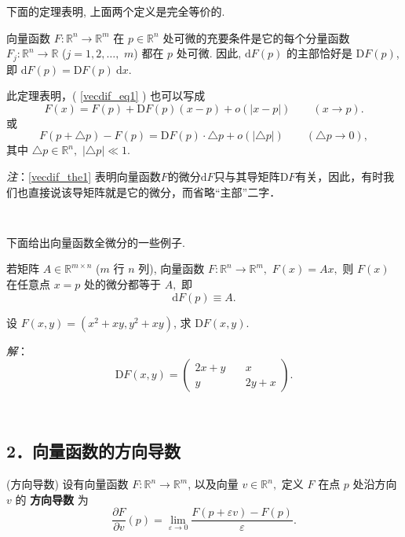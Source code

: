 下面的定理表明, 上面两个定义是完全等价的. 

\begin{theorem}{}\label{vecdif_the1}
向量函数 $F:\mathbb{R}^{n}\rightarrow\mathbb{R}^{m}$ 在 $p\in\mathbb{R}^{n}$
处可微的充要条件是它的每个分量函数 $F_{j}:\mathbb{R}^{n}\rightarrow\mathbb{R}$ ($j=1,2,\ldots,$ $m$)
都在 $p$ 处可微. 因此, $\mathrm{d}F(p)$ 的主部恰好是 $\mathrm{D}F(p)$, 即 $\mathrm{d}F(p)=\mathrm{D}F(p)~\mathrm{d}x$.

此定理表明，( \autoref{vecdif_eq1} ) 也可以写成
\[
  F(x)=F(p)+\mathrm{D}F(p)(x-p)+o(| x-p| )\quad\quad(x\rightarrow p).
\]
或
\[
F(p+\triangle p)-F(p)=\mathrm{D}F(p)\cdot\triangle p+o(|\triangle p|)\quad\quad(\triangle p\rightarrow0),
\]
其中 $\triangle p\in\mathbb{R}^{n},$ $|\triangle p|\ll1.$
\end{theorem}
\textsl{注}：\autoref{vecdif_the1} 表明向量函数$F$的微分$\mathrm{d}F$只与其导矩阵$\mathrm{D}F$有关，因此，有时我们也直接说该导矩阵就是它的微分，而省略“主部”二字．

\verb| |

下面给出向量函数全微分的一些例子.
\begin{example}{}
若矩阵 $A\in\mathbb{R}^{m\times n}$ ($m$ 行 $n$ 列), 向量函数 $F:\mathbb{R}^{n}\rightarrow\mathbb{R}^{m},$
$F(x)=Ax,$ 则 $F(x)$ 在任意点 $x=p$ 处的微分都等于 $A,$ 即
\[
\mathrm{d}F(p)\equiv A.
\]
\end{example}

\begin{example}{}
设 $F(x,y)=(x^{2}+xy,y^{2}+xy)$, 求 $\mathrm{D}F(x,y).$

\textsl{解}：
$$
\mathrm{D}F(x,y)=\left(\begin{array}{cc}
2x+y\quad & x\\
y & 2y+x
\end{array}\right).
$$
\end{example}
\verb| |

\subsection{2．向量函数的方向导数}
\begin{definition}{(方向导数)}
设有向量函数 $F:\mathbb{R}^{n}\rightarrow\mathbb{R}^{m}$, 以及向量 $v\in\mathbb{R}^{n},$
定义 $F$ 在点 $p$ 处沿方向 $v$ 的 \textbf{方向导数} 为 
\[
{\displaystyle \frac{\partial F}{\partial v}(p)={\displaystyle \lim_{\varepsilon\rightarrow0}{\displaystyle \frac{F(p+\varepsilon v)-F(p)}{\varepsilon}}.}}
\]
\end{definition}

